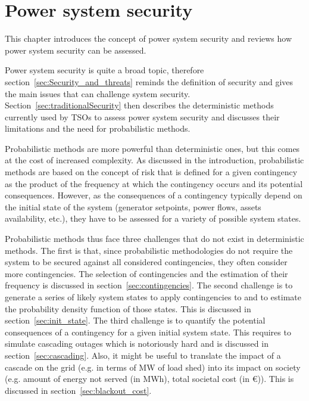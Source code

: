 \chapter{Power system security}
\label{ch:security}
\adjustmtc
\adjustmtc
\minitoc

This chapter introduces the concept of power system security and reviews how power system security can be assessed.

Power system security is quite a broad topic, therefore section~\ref{sec:Security_and_threats} reminds the definition of security and gives the main issues that can challenge system security. Section~\ref{sec:traditionalSecurity} then describes the deterministic methods currently used by TSOs to assess power system security and discusses their limitations and the need for probabilistic methods.

Probabilistic methods are more powerful than deterministic ones, but this comes at the cost of increased complexity. As discussed in the introduction, probabilistic methods are based on the concept of risk that is defined for a given contingency as the product of the frequency at which the contingency occurs and its potential consequences. However, as the consequences of a contingency typically depend on the initial state of the system (generator setpoints, power flows, assets availability, etc.), they have to be assessed for a variety of possible system states.

Probabilistic methods thus face three challenges that do not exist in deterministic methods. The first is that, since probabilistic methodologies do not require the system to be secured against all considered contingencies, they often consider more contingencies. The selection of contingencies and the estimation of their frequency is discussed in section~\ref{sec:contingencies}. The second challenge is to generate a series of likely system states to apply contingencies to and to estimate the probability density function of those states. This is discussed in section~\ref{sec:init_state}. The third challenge is to quantify the potential consequences of a contingency for a given initial system state. This requires to simulate cascading outages which is notoriously hard and is discussed in section~\ref{sec:cascading}. Also, it might be useful to translate the impact of a cascade on the grid (e.g. in terms of MW of load shed) into its impact on society (e.g. amount of energy not served (in MWh), total societal cost (in €)). This is discussed in section~\ref{sec:blackout_cost}.

